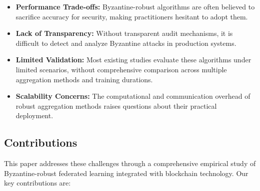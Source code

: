 \documentclass{ieeeaccess}
\begin{document}
\begin{itemize}
    \item \textbf{Performance Trade-offs:} Byzantine-robust algorithms are often believed to sacrifice accuracy for security, making practitioners hesitant to adopt them.
    \item \textbf{Lack of Transparency:} Without transparent audit mechanisms, it is difficult to detect and analyze Byzantine attacks in production systems.
    \item \textbf{Limited Validation:} Most existing studies evaluate these algorithms under limited scenarios, without comprehensive comparison across multiple aggregation methods and training durations.
    \item \textbf{Scalability Concerns:} The computational and communication overhead of robust aggregation methods raises questions about their practical deployment.
\end{itemize}

\subsection{Contributions}

This paper addresses these challenges through a comprehensive empirical study of Byzantine-robust federated learning integrated with blockchain technology. Our key contributions are:
\end{document}
